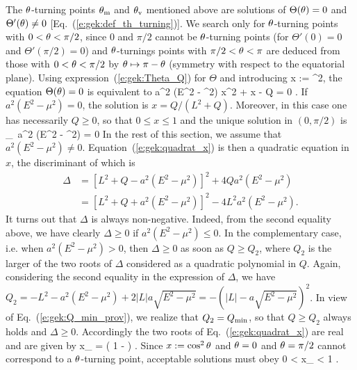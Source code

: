 The $\theta$-turning points $\theta_{\rm m}$ and $\theta_{\rm v}$ mentioned above are solutions of
$\Theta(\theta) = 0$ and  $\Theta'(\theta) \neq 0 $ [Eq.~(\ref{e:gek:def_th_turning})]. We search only for
$\theta$-turning points with $0 < \theta < \pi/2$, since $0$ and $\pi/2$ cannot be
$\theta$-turning points (for $\Theta'(0) = 0 $ and $\Theta'(\pi/2) = 0$) and
$\theta$-turnings points with  $\pi/2 < \theta < \pi$ are deduced from those
with $0 < \theta < \pi/2$ by $\theta \mapsto \pi - \theta$
(symmetry with respect to the equatorial plane).
Using expression~(\ref{e:gek:Theta_Q})
for $\Theta$ and introducing
\be
    x := \cos^2\th ,
\ee
the equation $\Theta(\theta) = 0$ is equivalent to
\be \label{e:gek:quadrat_x}
    a^2 (E^2 - \mu^2) x^2 + \left[ L^2 + Q - a^2 (E^2 - \mu^2) \right] x - Q = 0 .
\ee
If $a^2 (E^2 - \mu^2) = 0$, the solution is $x = Q/(L^2 + Q)$. Moreover, in this
case one has necessarily $Q \geq 0$, so that $0 \leq x \leq 1$ and
the unique solution in $(0,\pi/2)$ is
\be \label{e:gek:th0_a2E2mu2_zero}
     _{\, a^2 (E^2 - \mu^2) = 0}
\ee
In the rest of this section, we assume that $a^2 (E^2 - \mu^2) \neq 0$.
Equation~(\ref{e:gek:quadrat_x}) is then a quadratic equation in $x$, the discriminant
of which is
\begin{align}
\mathit{\Delta} & = \left[ L^2 + Q - a^2 (E^2 - \mu^2) \right]^2 + 4 Q a^2 (E^2 - \mu^2) \nonumber \\
  & = \left[ L^2 + Q + a^2 (E^2 - \mu^2) \right]^2 - 4 L^2 a^2 (E^2 - \mu^2) . \nonumber
\end{align}
It turns out that $\mathit{\Delta}$ is always non-negative. Indeed, from the second equality
above, we have clearly $\Delta \geq 0$ if $a^2(E^2 - \mu^2) \leq 0$. In the complementary
case, i.e. when $a^2(E^2 - \mu^2) > 0$, then $\mathit{\Delta} \geq 0$ as soon
as $Q \geq Q_2$, where $Q_2$ is the larger of the two roots of $\mathit{\Delta}$
considered as a quadratic polynomial in $Q$. Again, considering the second equality
in the expression of $\mathit{\Delta}$, we have
$Q_2 = - L^2 - a^2 (E^2 - \mu^2) + 2 |L| a \sqrt{E^2 - \mu^2} = - (|L| - a \sqrt{E^2 - \mu^2} )^2$.
In view of Eq.~(\ref{e:gek:Q_min_prov}), we realize that $Q_2 = Q_{\rm min}$,
so that $Q\geq Q_2$ always holds and $\Delta\geq 0$.
Accordingly the two roots of Eq.~(\ref{e:gek:quadrat_x}) are real and are
given by
\be \label{e:gek:th_turn_x_pm}
    x_{\pm} =  \left( 1 - 
        \pm {} \right) .
\ee
Since $x := \cos^2\theta$ and $\theta=0$ and $\theta=\pi/2$ cannot correspond
to a $\theta$-turning point,
acceptable solutions must obey
\be \label{e:gek:th_turn_x_pm_range}
    0 < x_{\pm} < 1 .
\ee


